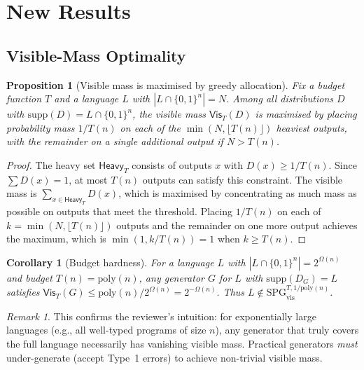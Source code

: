 \documentclass[11pt]{article}
\newcommand{\SPGvis}[2]{\mathrm{SPG}_{\mathrm{vis}}^{#1,#2}}
\newtheorem{proposition}[definition]{Proposition}
\newtheorem{corollary}[definition]{Corollary}
\theoremstyle{remark}
\newtheorem{remark}[definition]{Remark}
\theoremstyle{definition}
\begin{document}

\section{New Results}\label{sec:new-results}

\subsection{Visible-Mass Optimality}

\begin{proposition}[Visible mass is maximised by greedy allocation]
Fix a budget function $T$ and a language $L$ with $|L \cap \{0,1\}^n| = N$.
Among all distributions $D$ with $\mathrm{supp}(D) = L \cap \{0,1\}^n$, the
visible mass $\mathsf{Vis}_T(D)$ is maximised by placing probability mass
$1/T(n)$ on each of the $\min(N, \lfloor T(n) \rfloor)$ heaviest outputs,
with the remainder on a single additional output if $N > T(n)$.
\end{proposition}

\begin{proof}
The heavy set $\mathsf{Heavy}_T$ consists of outputs $x$ with
$D(x) \ge 1/T(n)$.  Since $\sum D(x) = 1$, at most $T(n)$ outputs can
satisfy this constraint.  The visible mass is
$\sum_{x \in \mathsf{Heavy}_T} D(x)$, which is maximised by concentrating
as much mass as possible on outputs that meet the threshold.  Placing
$1/T(n)$ on each of $k = \min(N, \lfloor T(n) \rfloor)$ outputs and the
remainder on one more output achieves the maximum, which is
$\min(1, k/T(n)) = 1$ when $k \ge T(n)$.
\end{proof}

\begin{corollary}[Budget hardness]
For a language $L$ with $|L \cap \{0,1\}^n| = 2^{\Omega(n)}$ and budget
$T(n) = \mathrm{poly}(n)$, any generator $G$ for $L$ with $\mathrm{supp}(D_G) = L$
satisfies $\mathsf{Vis}_T(G) \le \mathrm{poly}(n) / 2^{\Omega(n)} = 2^{-\Omega(n)}$.
Thus $L \notin \SPGvis{T}{1/\mathrm{poly}(n)}$.
\end{corollary}

\begin{remark}
This confirms the reviewer's intuition: for exponentially large languages
(e.g., all well-typed programs of size $n$), any generator that truly covers
the full language necessarily has vanishing visible mass.  Practical generators
\emph{must} under-generate (accept Type~1 errors) to achieve non-trivial
visible mass.
\end{remark}
\end{document}
